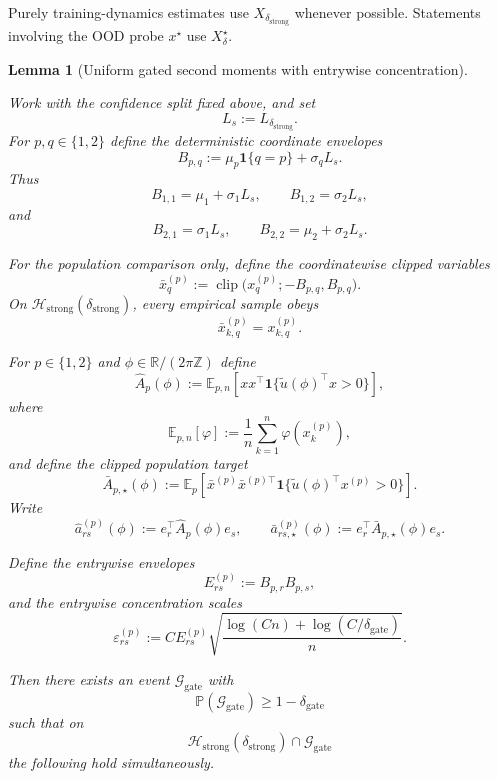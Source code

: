 \documentclass{article} %
\theoremstyle{plain}
\newtheorem{lemma}[theorem]{Lemma}
\theoremstyle{definition}
\theoremstyle{remark}
\begin{document}
Purely training-dynamics estimates use $X_{\delta_{\mathrm{strong}}}$
whenever possible. Statements involving the OOD probe $x^\star$ use
$X_\delta^\star$.



\begin{lemma}[Uniform gated second moments with entrywise concentration]
\label{lem:gated-moment-concentration}

Work with the confidence split fixed above, and set
\[
L_s:=L_{\delta_{\mathrm{strong}}}.
\]
For $p,q\in\{1,2\}$ define the deterministic coordinate envelopes
\[
\boxed{
B_{p,q}
:=
\mu_p\mathbf 1\{q=p\}
+
\sigma_qL_s.
}
\]
Thus
\[
B_{1,1}=\mu_1+\sigma_1L_s,
\qquad
B_{1,2}=\sigma_2L_s,
\]
and
\[
B_{2,1}=\sigma_1L_s,
\qquad
B_{2,2}=\mu_2+\sigma_2L_s.
\]

For the population comparison only, define the coordinatewise clipped
variables
\[
\boxed{
\bar x_q^{(p)}
:=
\operatorname{clip}
\bigl(
 x_q^{(p)};
 -B_{p,q},B_{p,q}
\bigr).
}
\]
On $\mathcal H_{\mathrm{strong}}(\delta_{\mathrm{strong}})$, every empirical
sample obeys
\[
\bar x_{k,q}^{(p)}=x_{k,q}^{(p)}.
\]

For $p\in\{1,2\}$ and $\phi\in\mathbb R/(2\pi\mathbb Z)$ define
\[
\boxed{
\widehat A_p(\phi)
:=
\mathbb E_{p,n}
\left[
xx^\top
\mathbf 1\{
\widetilde u(\phi)^\top x>0
\}
\right],
}
\]
where
\[
\mathbb E_{p,n}[\varphi]
:=
\frac1n\sum_{k=1}^n\varphi(x_k^{(p)}),
\]
and define the clipped population target
\[
\boxed{
\bar A_{p,\star}(\phi)
:=
\mathbb E_p
\left[
\bar x^{(p)}\bar x^{(p)\top}
\mathbf 1\{
\widetilde u(\phi)^\top x^{(p)}>0
\}
\right].
}
\]
Write
\[
\widehat a_{rs}^{(p)}(\phi)
:=
e_r^\top\widehat A_p(\phi)e_s,
\qquad
\bar a_{rs,\star}^{(p)}(\phi)
:=
e_r^\top\bar A_{p,\star}(\phi)e_s.
\]

Define the entrywise envelopes
\[
\boxed{
E_{rs}^{(p)}
:=
B_{p,r}B_{p,s},
}
\]
and the entrywise concentration scales
\[
\boxed{
\varepsilon_{rs}^{(p)}
:=
C E_{rs}^{(p)}
\sqrt{
\frac{
\log(Cn)+\log(C/\delta_{\mathrm{gate}})
}{n}
}.
}
\tag{gate-entry-error}\label{eq:gate-entry-error}
\]

Then there exists an event $\mathcal G_{\mathrm{gate}}$ with
\[
\boxed{
\mathbb P(\mathcal G_{\mathrm{gate}})
\ge
1-\delta_{\mathrm{gate}}
}
\]
such that on
\[
\mathcal H_{\mathrm{strong}}(\delta_{\mathrm{strong}})
\cap
\mathcal G_{\mathrm{gate}}
\]
the following hold simultaneously.


\end{lemma}
\end{document}
